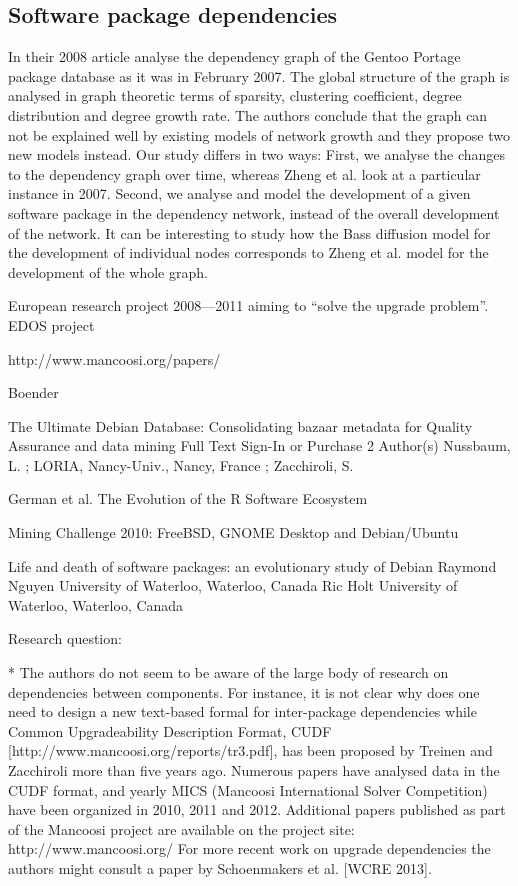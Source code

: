 \documentclass[smallextended,final]{svjour3}
\begin{document}
\subsection{Software package dependencies}

In their 2008 article \citet{zheng08} analyse the dependency graph of the Gentoo Portage package database as it was in February 2007. The global structure of the graph is analysed in graph theoretic terms of sparsity, clustering coefficient, degree distribution and degree growth rate. The authors conclude that the graph can not be explained well by existing models of network growth and they propose two new models instead. Our study differs in two ways: First, we analyse the changes to the dependency graph over time, whereas Zheng et al. look at a particular instance in 2007. Second, we analyse and model the development of a given software package in the dependency network, instead of the overall development of the network. It can be interesting to study how the Bass diffusion model for the development of individual nodes corresponds to Zheng et al. model for the development of the whole graph.

European research project 2008—2011 aiming to ``solve the upgrade problem''.
EDOS project

http://www.mancoosi.org/papers/

Boender 

The Ultimate Debian Database: Consolidating bazaar metadata for Quality Assurance and data mining
Full Text Sign-In or Purchase
2 Author(s)
Nussbaum, L. ; LORIA, Nancy-Univ., Nancy, France ; Zacchiroli, S.

German et al. The Evolution of the R Software Ecosystem

Mining Challenge 2010: FreeBSD, GNOME Desktop and Debian/Ubuntu


Life and death of software packages: an evolutionary study of Debian
Raymond Nguyen  University of Waterloo, Waterloo, Canada
Ric Holt        University of Waterloo, Waterloo, Canada


Research question:

* The authors do not seem to be aware of the large body of research on dependencies between components. For instance, it is not clear why does one need to design a new text-based formal for inter-package dependencies while Common Upgradeability Description Format, CUDF [http://www.mancoosi.org/reports/tr3.pdf], has been proposed by Treinen and Zacchiroli more than five years ago. Numerous papers have analysed data in the CUDF format, and yearly MICS (Mancoosi International Solver Competition) have been organized in 2010, 2011 and 2012. Additional papers published as part of the Mancoosi project are available on the project site: http://www.mancoosi.org/ For more recent work on upgrade dependencies the authors might consult a paper by Schoenmakers et al. [WCRE 2013].
\end{document}
